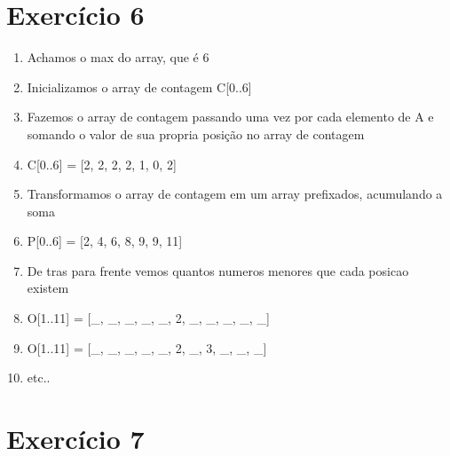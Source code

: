 \documentclass[a4paper,12pt]{article}
\begin{document}
\section*{Exercício 6}
\begin{enumerate}
    \item Achamos o max do array, que é 6
    \item Inicializamos o array de contagem C[0..6]
    \item Fazemos o array de contagem passando uma vez por cada elemento de A e somando o valor de sua propria posição no array de contagem
    \item C[0..6] = [2, 2, 2, 2, 1, 0, 2]
    \item Transformamos o array de contagem em um array prefixados, acumulando a soma
    \item P[0..6] = [2, 4, 6, 8, 9, 9, 11]
    \item De tras para frente vemos quantos numeros menores que cada posicao existem
    \item O[1..11] = [_, _, _, _, _, 2, _, _, _, _, _]
    \item O[1..11] = [_, _, _, _, _, 2, _, 3, _, _, _]
    \item etc..
\end{enumerate}

\section*{Exercício 7}
\end{document}

